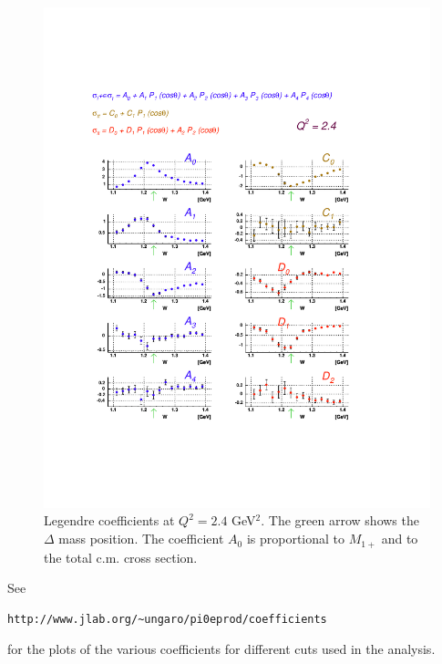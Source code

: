 \begin{figure}[h]
 \includegraphics[width = 15cm, bb=0 100 540 700]{analysis/img/Coefficients_q2.4}
  \caption[Legendre coefficients at $Q^2 = 2.4$ GeV$^2$]
          { Legendre coefficients at $Q^2 = 2.4$ GeV$^2$. The green arrow shows the $\Delta$ mass
	             position. The coefficient $A_0$ is proportional to $M_{1+}$ and to the total c.m. cross section.}
 \label{fig:Coefficients_q2.4}
\end{figure}  


\cia
See    \begin{verbatim} 
http://www.jlab.org/~ungaro/pi0eprod/coefficients
\end{verbatim}
for the plots of the various coefficients for different cuts used in the analysis.
















